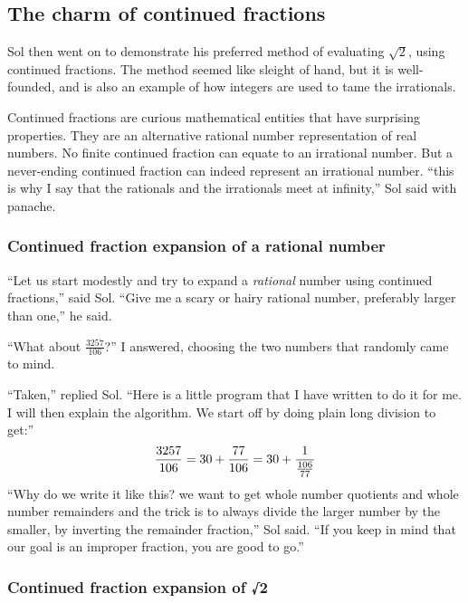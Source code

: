 \documentclass[
  a4paper,
]{article}
\begin{document}
\subsection{The charm of continued
fractions}\label{the-charm-of-continued-fractions}

Sol then went on to demonstrate his preferred method of evaluating
\(\sqrt{2}\), using continued fractions. The method seemed like sleight
of hand, but it is well-founded, and is also an example of how integers
are used to tame the irrationals.

Continued fractions are curious mathematical entities that have
surprising properties. They are an alternative rational number
representation of real numbers. No finite continued fraction can equate
to an irrational number. But a never-ending continued fraction can
indeed represent an irrational number. ``this is why I say that the
rationals and the irrationals meet at infinity,'' Sol said with panache.

\subsubsection{Continued fraction expansion of a rational
number}\label{continued-fraction-expansion-of-a-rational-number}

``Let us start modestly and try to expand a \emph{rational} number using
continued fractions,'' said Sol. ``Give me a scary or hairy rational
number, preferably larger than one,'' he said.

``What about \(\frac{3257}{106}\)?'' I answered, choosing the two
numbers that randomly came to mind.

``Taken,'' replied Sol. ``Here is a little program that I have written
to do it for me. I will then explain the algorithm. We start off by
doing plain long division to get:'' \[
\frac{3257}{106} = 30 + \frac{77}{106} = 30 + \frac{1}{\frac{106}{77}}\\
\] ``Why do we write it like this? we want to get whole number quotients
and whole number remainders and the trick is to always divide the larger
number by the smaller, by inverting the remainder fraction,'' Sol said.
``If you keep in mind that our goal is an improper fraction, you are
good to go.''

\subsubsection{Continued fraction expansion of
√2}\label{continued-fraction-expansion-of-2}
\end{document}
